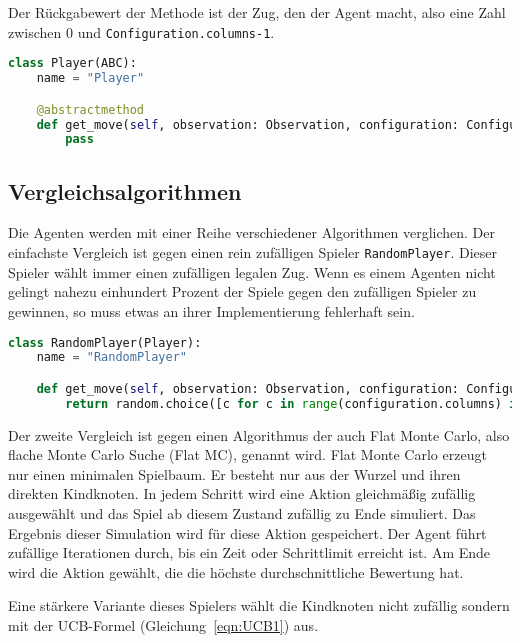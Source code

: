 Der Rückgabewert der Methode ist der Zug, den der Agent macht, also eine Zahl zwischen 0 und \verb|Configuration.columns-1|.

\begin{lstlisting}[language=Python,caption=Die Basisklasse aller Agenten.,label={lst:baseplayer}]
class Player(ABC):
    name = "Player"

    @abstractmethod
    def get_move(self, observation: Observation, configuration: Configuration) -> int:
        pass
\end{lstlisting}

\subsection{Vergleichsalgorithmen}
\label{chap:vergleiche-impl}

Die Agenten werden mit einer Reihe verschiedener Algorithmen verglichen.
Der einfachste Vergleich ist gegen einen rein zufälligen Spieler \verb|RandomPlayer|.
Dieser Spieler wählt immer einen zufälligen legalen Zug.
Wenn es einem Agenten nicht gelingt nahezu einhundert Prozent der Spiele gegen den zufälligen Spieler zu gewinnen, so muss etwas an ihrer Implementierung fehlerhaft sein.

\begin{lstlisting}[language=Python,caption=Ein Spieler der zufällige Züge wählt.,label={lst:randomplayer}]
class RandomPlayer(Player):
    name = "RandomPlayer"

    def get_move(self, observation: Observation, configuration: Configuration) -> int:
        return random.choice([c for c in range(configuration.columns) if observation.board[c] == 0])
\end{lstlisting}

Der zweite Vergleich ist gegen einen Algorithmus der auch Flat Monte Carlo, also flache Monte Carlo Suche (Flat MC), genannt wird.
Flat Monte Carlo erzeugt nur einen minimalen Spielbaum.
Er besteht nur aus der Wurzel und ihren direkten Kindknoten.
In jedem Schritt wird eine Aktion gleichmäßig zufällig ausgewählt und das Spiel ab diesem Zustand zufällig zu Ende simuliert.
Das Ergebnis dieser Simulation wird für diese Aktion gespeichert.
Der Agent führt zufällige Iterationen durch, bis ein Zeit oder Schrittlimit erreicht ist.
Am Ende wird die Aktion gewählt, die die höchste durchschnittliche Bewertung hat.

Eine stärkere Variante dieses Spielers wählt die Kindknoten nicht zufällig sondern mit der UCB-Formel (Gleichung~\ref{eqn:UCB1}) aus.

